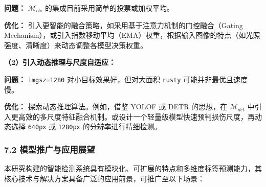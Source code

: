 \documentclass[
]{article}
\begin{document}
\textbf{问题：} \(\mathcal{M}_{cls}\)
的集成目前采用简单的投票或加权平均。

\textbf{优化：}
引入更智能的融合策略，如采用基于注意力机制的门控融合（Gating
Mechanism），或引入指数移动平均（EMA）权重，根据输入图像的特点（如光照强度、清晰度）来动态调整各模型决策权重。

\textbf{（2）引入动态推理与尺度自适应：}

\textbf{问题：} \texttt{imgsz=1280} 对小目标效果好，但对大面积
\texttt{rusty} 可能并非最优且速度慢。

\textbf{优化：} 探索动态推理算法。例如，借鉴 YOLOF 或 DETR 的思想，在
\(\mathcal{M}_{det}\)
中引入更高效的多尺度特征融合机制。或设计一个轻量级模型快速预判损伤尺度，再动态选择
\texttt{640px} 或 \texttt{1280px} 的分辨率进行精细检测。

\subsubsection{\texorpdfstring{\textbf{7.2
}模型推广与应用展望}{7.2 模型推广与应用展望}}\label{72-ux6a21ux578bux63a8ux5e7fux4e0eux5e94ux7528ux5c55ux671b}

本研究构建的智能检测系统具有模块化、可扩展的特点和多维度标签预测能力，其核心技术与解决方案具备广泛的应用前景，可推广至以下场景：
\end{document}
